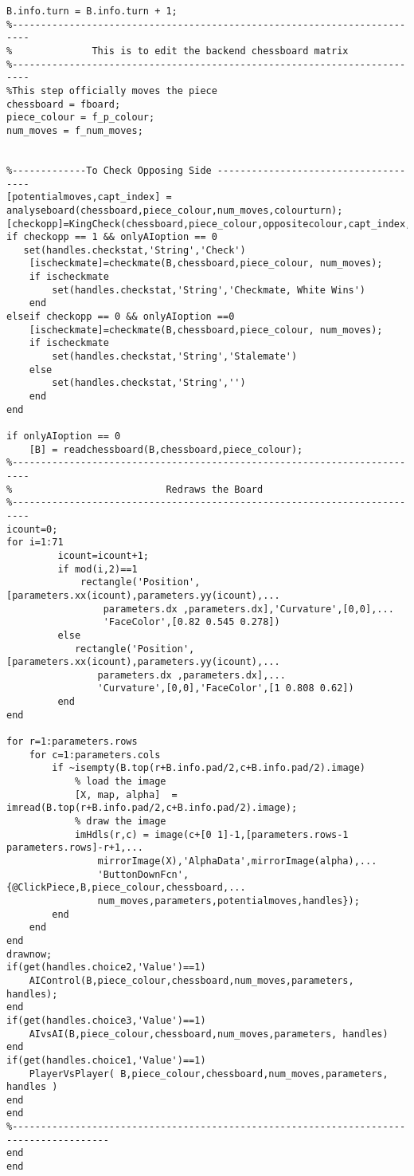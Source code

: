 \documentclass{article}
\begin{document}
\begin{lstlisting}
B.info.turn = B.info.turn + 1;
%-------------------------------------------------------------------------
%              This is to edit the backend chessboard matrix
%-------------------------------------------------------------------------
%This step officially moves the piece
chessboard = fboard;
piece_colour = f_p_colour; 
num_moves = f_num_moves;


%-------------To Check Opposing Side -------------------------------------
[potentialmoves,capt_index] = analyseboard(chessboard,piece_colour,num_moves,colourturn);
[checkopp]=KingCheck(chessboard,piece_colour,oppositecolour,capt_index,potentialmoves);
if checkopp == 1 && onlyAIoption == 0
   set(handles.checkstat,'String','Check')
    [ischeckmate]=checkmate(B,chessboard,piece_colour, num_moves);
    if ischeckmate
        set(handles.checkstat,'String','Checkmate, White Wins')
    end
elseif checkopp == 0 && onlyAIoption ==0
    [ischeckmate]=checkmate(B,chessboard,piece_colour, num_moves);
    if ischeckmate
        set(handles.checkstat,'String','Stalemate')
    else
        set(handles.checkstat,'String','')
    end
end

if onlyAIoption == 0
    [B] = readchessboard(B,chessboard,piece_colour);
%-------------------------------------------------------------------------
%                           Redraws the Board
%-------------------------------------------------------------------------
icount=0;
for i=1:71
         icount=icount+1;
         if mod(i,2)==1
             rectangle('Position',[parameters.xx(icount),parameters.yy(icount),...
                 parameters.dx ,parameters.dx],'Curvature',[0,0],...
                 'FaceColor',[0.82 0.545 0.278])
         else
            rectangle('Position',[parameters.xx(icount),parameters.yy(icount),...
                parameters.dx ,parameters.dx],...
                'Curvature',[0,0],'FaceColor',[1 0.808 0.62])             
         end
end

for r=1:parameters.rows
    for c=1:parameters.cols
        if ~isempty(B.top(r+B.info.pad/2,c+B.info.pad/2).image)
            % load the image
            [X, map, alpha]  = imread(B.top(r+B.info.pad/2,c+B.info.pad/2).image);
            % draw the image
            imHdls(r,c) = image(c+[0 1]-1,[parameters.rows-1 parameters.rows]-r+1,...
                mirrorImage(X),'AlphaData',mirrorImage(alpha),...
                'ButtonDownFcn',{@ClickPiece,B,piece_colour,chessboard,...
                num_moves,parameters,potentialmoves,handles});
        end
    end
end
drawnow;
if(get(handles.choice2,'Value')==1)
    AIControl(B,piece_colour,chessboard,num_moves,parameters, handles);
end
if(get(handles.choice3,'Value')==1)
    AIvsAI(B,piece_colour,chessboard,num_moves,parameters, handles)
end
if(get(handles.choice1,'Value')==1)
    PlayerVsPlayer( B,piece_colour,chessboard,num_moves,parameters, handles )
end
end
%---------------------------------------------------------------------------------------
end
end
\end{lstlisting}
\end{document}

